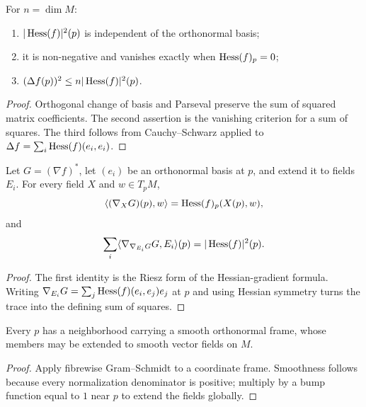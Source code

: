 \begin{lemma}
\label{lem:hessian-norm-sq-basic}





For $n=\dim M$:
\begin{enumerate}
\item $|\operatorname{Hess}(f)|^2(p)$ is independent of the orthonormal basis;
\item it is non-negative and vanishes exactly when $\operatorname{Hess}(f)_p=0$;
\item $(\Delta f(p))^2\le n|\operatorname{Hess}(f)|^2(p)$.
\end{enumerate}
\end{lemma}
\begin{proof}
\sketch
{}

Orthogonal change of basis and Parseval preserve the sum of squared
matrix coefficients. The second assertion is the vanishing criterion
for a sum of squares. The third follows from Cauchy--Schwarz applied to
$\Delta f=\sum_i\operatorname{Hess}(f)(e_i,e_i)$.
\end{proof}

\begin{lemma}
\label{lem:hessian-riesz-trace}




Let $G=(\nabla f)^*$, let $(e_i)$ be an orthonormal basis at $p$, and
extend it to fields $E_i$. For every field $X$ and $w\in T_pM$,
$$\langle(\nabla_XG)(p),w\rangle=\operatorname{Hess}(f)_p(X(p),w),$$
and
$$\sum_i\langle\nabla_{\nabla_{E_i}G}G,E_i\rangle(p)
=|\operatorname{Hess}(f)|^2(p).$$
\end{lemma}
\begin{proof}
\sketch
{}

The first identity is the Riesz form of the Hessian-gradient formula.
Writing $\nabla_{E_i}G=\sum_j\operatorname{Hess}(f)(e_i,e_j)e_j$ at $p$ and using
Hessian symmetry turns the trace into the defining sum of squares.
\end{proof}

\begin{lemma}
\label{lem:local-orthonormal-frame}





Every $p$ has a neighborhood carrying a smooth orthonormal frame,
whose members may be extended to smooth vector fields on $M$.
\end{lemma}
\begin{proof}
\sketch
{}

Apply fibrewise Gram--Schmidt to a coordinate frame. Smoothness follows
because every normalization denominator is positive; multiply by a
bump function equal to $1$ near $p$ to extend the fields globally.
\end{proof}

